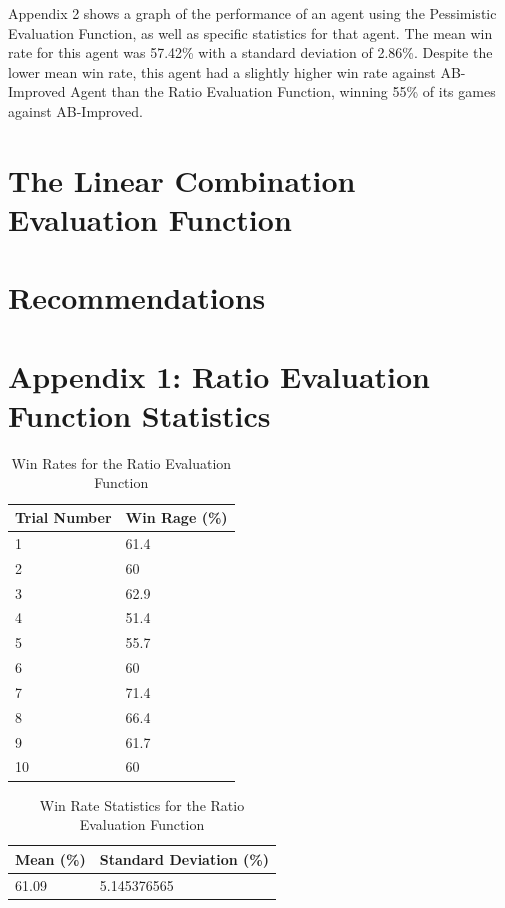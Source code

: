 \documentclass[12pt]{article}
\begin{document}
Appendix 2 shows a graph of the performance of an agent using the Pessimistic Evaluation Function, as well as specific statistics for that agent. The mean win rate for this agent was 57.42\% with a standard deviation of 2.86\%. Despite the lower mean win rate, this agent had a slightly higher win rate against AB-Improved Agent than the Ratio Evaluation Function, winning 55\% of its games against AB-Improved.

\section{The Linear Combination Evaluation Function}

\section{Recommendations}

\newpage
\section{Appendix 1: Ratio Evaluation Function Statistics}
\begin{table}[h]
\centering
\caption{Win Rates for the Ratio Evaluation Function}
\label{ratio-eval}
\begin{tabular}{@{}|l|l|@{}}
\toprule
Trial Number & Win Rage (\%) \\ \midrule
1            & 61.4          \\ \midrule
2            & 60            \\ \midrule
3            & 62.9          \\ \midrule
4            & 51.4          \\ \midrule
5            & 55.7          \\ \midrule
6            & 60            \\ \midrule
7            & 71.4          \\ \midrule
8            & 66.4          \\ \midrule
9            & 61.7          \\ \midrule
10           & 60            \\ \bottomrule
\end{tabular}
\end{table}

\begin{table}[h]
\centering
\caption{Win Rate Statistics for the Ratio Evaluation Function}
\label{ratio-stats}
\begin{tabular}{@{}|l|l|@{}}
\toprule
Mean (\%)& Standard Deviation (\%) \\ \midrule
61.09           & 5.145376565
\\ \bottomrule
\end{tabular}
\end{table}
\end{document}
